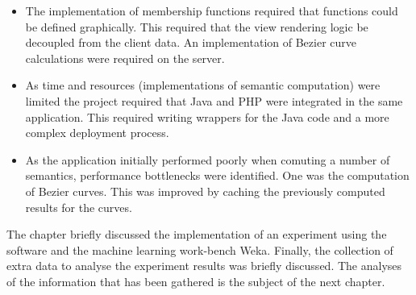 \begin{itemize}
\item The implementation of membership functions required that functions could be defined graphically. This required that the view rendering logic be decoupled from the client data. An implementation of Bezier curve calculations were required on the server.
\item As time and resources (implementations of semantic computation) were limited the project required that Java and PHP were integrated in the same application. This required writing wrappers for the Java code and a more complex deployment process.
\item As the application initially performed poorly when comuting a number of semantics, performance bottlenecks were identified. One was the computation of Bezier curves. This was improved by caching the previously computed results for the curves. 
\end{itemize}

The chapter briefly discussed the implementation of an experiment using the software and the machine learning work-bench Weka. Finally, the collection of extra data to analyse the experiment results was briefly discussed. The analyses of the information that has been gathered is the subject of the next chapter.